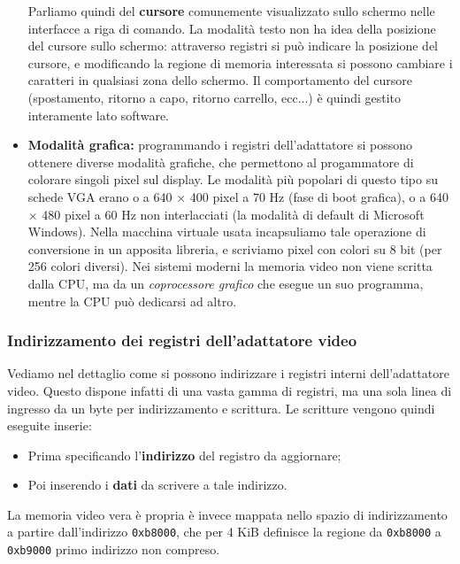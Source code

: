\documentclass[a4paper,11pt]{article}
\begin{document}
\begin{itemize}
		Parliamo quindi del \textbf{cursore} comunemente visualizzato sullo schermo nelle interfacce a riga di comando.
		La modalità testo non ha idea della posizione del cursore sullo schermo: attraverso registri si può indicare la posizione del cursore, e modificando la regione di memoria interessata si possono cambiare i caratteri in qualsiasi zona dello schermo.
		Il comportamento del cursore (spostamento, ritorno a capo, ritorno carrello, ecc...) è quindi gestito interamente lato software.
	\item \textbf{Modalità grafica:} programmando i registri dell'adattatore si possono ottenere diverse modalità grafiche, che permettono al progammatore di colorare singoli pixel sul display.
		Le modalità più popolari di questo tipo su schede VGA erano o a 640 $\times$ 400 pixel a 70 Hz (fase di boot grafica), o a 640 $\times$ 480 pixel a 60 Hz non interlacciati (la modalità di default di Microsoft Windows). 
	Nella macchina virtuale usata incapsuliamo tale operazione di conversione in un apposita libreria, e scriviamo pixel con colori su 8 bit (per 256 colori diversi).
	Nei sistemi moderni la memoria video non viene scritta dalla CPU, ma da un \textit{coprocessore grafico} che esegue un suo programma, mentre la CPU può dedicarsi ad altro.	
\end{itemize}

\subsubsection{Indirizzamento dei registri dell'adattatore video}
Vediamo nel dettaglio come si possono indirizzare i registri interni dell'adattatore video.
Questo dispone infatti di una vasta gamma di registri, ma una sola linea di ingresso da un byte per indirizzamento e scrittura.
Le scritture vengono quindi eseguite inserie:
\begin{itemize}
	\item Prima specificando l'\textbf{indirizzo} del registro da aggiornare;
	\item Poi inserendo i \textbf{dati} da scrivere a tale indirizzo.
\end{itemize}

La memoria video vera è propria è invece mappata nello spazio di indirizzamento a partire dall'indirizzo \lstinline|0xb8000|, che per 4 KiB definisce la regione da \lstinline|0xb8000| a \lstinline|0xb9000| primo indirizzo non compreso.

\par\smallskip
\end{document}
